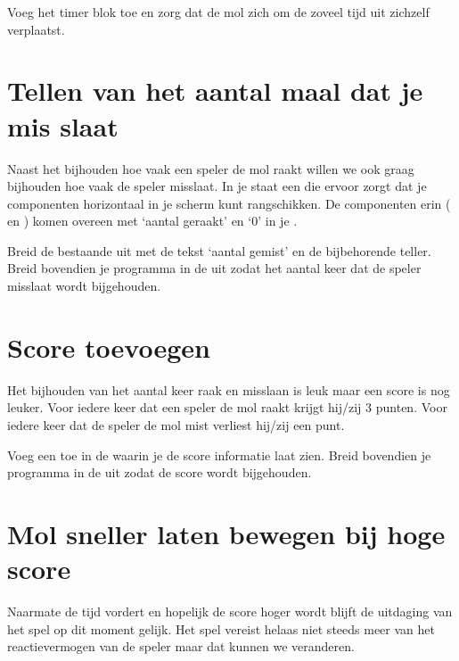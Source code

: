 \begin{opgave}
    \opgVraag
	Voeg het timer blok toe en zorg dat de mol zich om de zoveel tijd uit zichzelf verplaatst.
\end{opgave}

\section{Tellen van het aantal maal dat je mis slaat}
Naast het bijhouden hoe vaak een speler de mol raakt willen we ook graag bijhouden hoe vaak de speler misslaat. In je  staat een  die ervoor zorgt dat je componenten horizontaal 
in je scherm kunt rangschikken. 
De componenten erin ( en ) komen overeen met `aantal geraakt' en `0' in je .

\begin{opgave}
    \opgVraag
	Breid de bestaande  uit met de tekst `aantal gemist' en de bijbehorende teller. Breid bovendien je programma in de  uit zodat het aantal keer dat de speler misslaat wordt bijgehouden. 
\end{opgave}

\section{Score toevoegen}
Het bijhouden van het aantal keer raak en misslaan is leuk maar een score is nog leuker. 
Voor iedere keer dat een speler de mol raakt krijgt hij/zij 3 punten. 
Voor iedere keer dat de speler de mol mist verliest hij/zij een punt. 

\begin{opgave}
    \opgVraag
	Voeg een  toe in de  waarin je de score informatie laat zien. Breid bovendien je programma in de  uit zodat de score wordt bijgehouden. 
\end{opgave}

\section{Mol sneller laten bewegen bij hoge score}
Naarmate de tijd vordert en hopelijk de score hoger wordt blijft de uitdaging van het spel op dit moment gelijk. 
Het spel vereist helaas niet steeds meer van het reactievermogen van de speler maar dat kunnen we veranderen.

